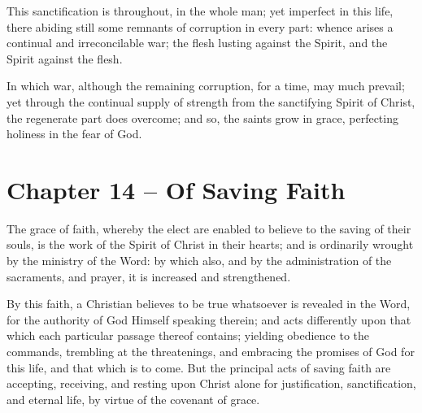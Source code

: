 \begin{outerlst}[left=0pt,labelsep=0pt]
\begin{innerlst}[resume*]
\item This sanctification is throughout, in the whole man; yet imperfect in this life, there abiding still some remnants of corruption in every part: whence arises a continual and irreconcilable war; the flesh lusting against the Spirit, and the Spirit against the flesh.   

\item In which war, although the remaining corruption, for a time, may much prevail; yet through the continual supply of strength from the sanctifying Spirit of Christ, the regenerate part does overcome; and so, the saints grow in grace, perfecting holiness in the fear of God.  
\end{innerlst}

\item
{}
\section{Chapter 14 -- Of Saving Faith}
\begin{innerlst}[resume*]

\item The grace of faith, whereby the elect are enabled to believe to the saving of their souls, is the work of the Spirit of Christ in their hearts; and is ordinarily wrought by the ministry of the Word: by which also, and by the administration of the sacraments, and prayer, it is increased and strengthened.   

\item By this faith, a Christian believes to be true whatsoever is revealed in the Word, for the authority of God Himself speaking therein; and acts differently upon that which each particular passage thereof contains; yielding obedience to the commands, trembling at the threatenings, and embracing the promises of God for this life, and that which is to come. But the principal acts of saving faith are accepting, receiving, and resting upon Christ alone for justification, sanctification, and eternal life, by virtue of the covenant of grace.   


\end{innerlst}
\end{outerlst}
